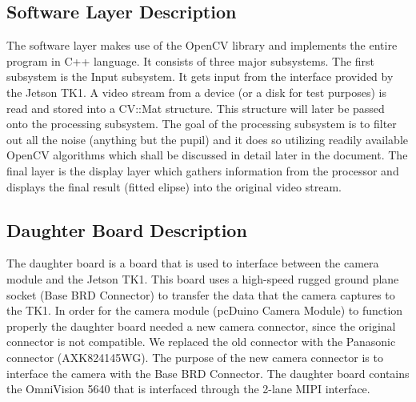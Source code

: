 \subsection{Software Layer Description}
The software layer makes use of the OpenCV library and implements the entire program in C++ language. It consists of three major subsystems. The first subsystem is the Input subsystem. It gets input from the interface provided by the Jetson TK1. A video stream from a device (or a disk for test purposes) is read and stored into a CV::Mat structure. This structure will later be passed onto the processing subsystem.
The goal of the processing subsystem is to filter out all the noise (anything but the pupil) and it does so utilizing readily available OpenCV algorithms which shall be discussed in detail later in the document.
The final layer is the display layer which gathers information from the processor and displays the final result (fitted elipse) into the original video stream. 
\newline

\subsection{Daughter Board Description}
The daughter board is a board that is used to interface between the camera module 
and the Jetson TK1. This board uses a high-speed rugged ground plane socket 
(Base BRD Connector) to transfer the data that the camera captures to the TK1. In 
order for the camera module (pcDuino Camera Module) to function properly the 
daughter board needed a new camera connector, since the original connector is not 
compatible. We replaced the old connector with the Panasonic connector 
(AXK824145WG). The purpose of the new camera connector is to interface the 
camera with the Base BRD Connector. The daughter board contains the OmniVision 
5640 that is interfaced through the 2-lane MIPI interface.
\newline

